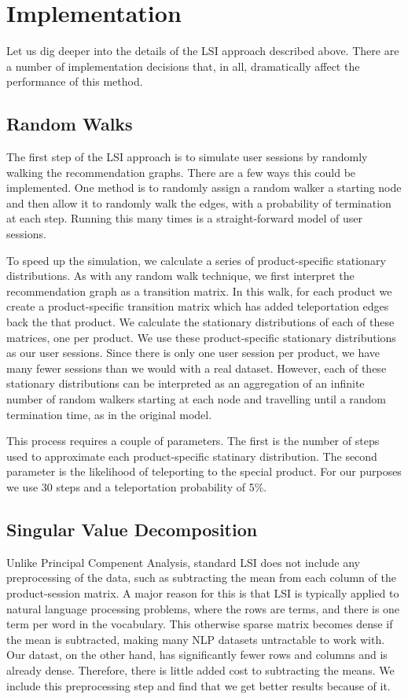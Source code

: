 \documentclass[11pt]{article}
\begin{document}
\section*{Implementation}
Let us dig deeper into the details of the LSI approach described above. There 
are a number of implementation decisions that, in all, dramatically affect the
performance of this method.

\subsection*{Random Walks}
The first step of the LSI approach is to simulate user sessions by randomly
walking the recommendation graphs. There are a few ways this could be implemented.
One method is to randomly assign a random walker a starting node and then allow
it to randomly walk the edges, with a probability of termination at each step.
Running this many times is a straight-forward model of user sessions.

To speed up the simulation, we calculate a series of product-specific stationary
distributions. As with any random walk technique, we first interpret the 
recommendation graph as a transition matrix. In this walk, for each product we create a
product-specific transition matrix which has added teleportation edges back the
that product. We calculate the stationary distributions of each of these
matrices, one per product. We use these product-specific stationary
distributions as our user sessions. Since there is only one user session per 
product, we have many fewer sessions than we would with a real dataset. However,
each of these stationary distributions can be interpreted as an aggregation of
an infinite number of random walkers starting at each node and travelling until
a random termination time, as in the original model.

This process requires a couple of parameters. The first is the number of steps used to
approximate each product-specific statinary distribution. The second parameter
is the likelihood of teleporting to the special product. For our purposes we use
30 steps and a teleportation probability of 5\%.

\subsection*{Singular Value Decomposition}
Unlike Principal Compenent Analysis, standard LSI does not include any
preprocessing of the data, such as subtracting the mean from each column of the
product-session matrix. A major reason for this is that LSI is typically applied
to natural language processing problems, where the rows are terms, and there is
one term per word in the vocabulary. This otherwise sparse matrix becomes dense
if the mean is subtracted, making many NLP datasets untractable to work with. 
Our datast, on the other hand, has significantly fewer rows and columns and is
already dense. Therefore, there is little added cost to subtracting the
means. We include this preprocessing step and find that we get better results
because of it.
\end{document}

